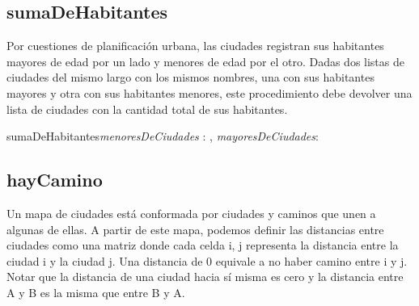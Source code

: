 \documentclass[10pt,a4paper]{article}
\begin{document}
\subsection{sumaDeHabitantes}

Por cuestiones de planificación urbana, las ciudades registran sus habitantes mayores de edad por un lado y menores de edad por el otro. Dadas dos listas de ciudades del mismo largo con los mismos nombres, una con sus habitantes mayores y otra con sus habitantes menores, este procedimiento debe devolver una lista de ciudades con la cantidad total de sus habitantes.

\vspace{2mm}


\begin{proc}{sumaDeHabitantes}{\In \textit{menoresDeCiudades} : , \In \textit{mayoresDeCiudades}: }{}
\end{proc}




\vspace{4mm}


\subsection{hayCamino}

 Un mapa de ciudades está conformada por ciudades y caminos que unen a algunas de ellas. A partir de este mapa, podemos definir las distancias entre ciudades como una matriz donde cada celda i, j representa la distancia entre la ciudad i y la ciudad j. Una distancia de 0 equivale a no haber camino entre i y j. Notar que la distancia de una ciudad hacia sí misma es cero y la distancia entre A y B es la misma que entre B y A.
 
\end{document}
